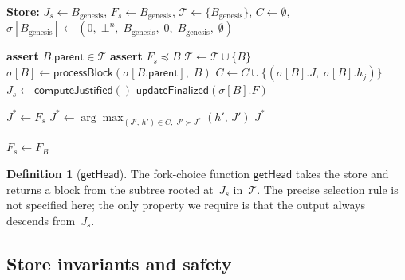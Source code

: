 \documentclass{article}
\newcommand{\parent}{\mathsf{parent}}
\theoremstyle{plain}
\theoremstyle{definition}
\newtheorem{definition}[theorem]{Definition}
\theoremstyle{remark}
\begin{document}
\begin{center}
\begin{boxedminipage}{\textwidth}
\begin{algorithmic}[1]

\State \textbf{Store:} $J_s \gets B_{\mathrm{genesis}}$, \; $F_s \gets B_{\mathrm{genesis}}$, \; $\mathcal{T} \gets \{B_{\mathrm{genesis}}\}$, \; $C \gets \emptyset$, \; $\sigma[B_{\mathrm{genesis}}] \gets (0,\; \bot^n,\; B_{\mathrm{genesis}},\; 0,\; B_{\mathrm{genesis}},\; \emptyset)$
\vspace{3pt}

  \State \textbf{assert} $B.\parent \in \mathcal{T}$ 
  \State \textbf{assert} $F_s \preceq B$ 
  \State $\mathcal{T} \gets \mathcal{T} \cup \{B\}$
  \State $\sigma[B] \gets \textsf{processBlock}(\sigma[B.\parent],\; B)$
  \State $C \gets C \cup \{(\sigma[B].J,\; \sigma[B].h_j)\}$
  \State $J_s \gets \textsf{computeJustified}()$
  \State $\textsf{updateFinalized}(\sigma[B].F)$
\EndFunction
\vspace{3pt}

  \State $J^* \gets F_s$
   
    \State $J^* \gets \arg\max_{(J',\, h') \in C,\; J' \succ J^*} (h',\, J')$
  \EndWhile
  \State \Return $J^*$
\EndFunction
\vspace{3pt}

    \State $F_s \gets F_B$
  \EndIf
\EndFunction

\end{algorithmic}
\end{boxedminipage}
\end{center}

\begin{definition}[$\textsf{getHead}$]\label{def:gethead}
The fork-choice function $\textsf{getHead}$ takes the store and returns a block from the subtree rooted at~$J_s$ in~$\mathcal{T}$.
The precise selection rule is not specified here; the only property we require is that the output always descends from~$J_s$.
\end{definition}

\subsection{Store invariants and safety}
\end{document}
